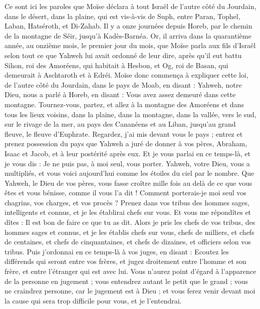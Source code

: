 \begin{multicols}{2}
\VerseOne{}Ce sont ici les paroles que Moïse déclara à tout Israël de l'autre côté du Jourdain, dans le désert, dans la plaine, qui est vis-à-vis de Suph, entre Paran, Tophel, Laban, Hatséroth, et Di-Zahab.
Il y a onze journées depuis Horeb, par le chemin de la montagne de Séir, jusqu'à Kadès-Barnéa.
Or, il arriva dans la quarantième année, au onzième mois, le premier jour du mois, que Moïse parla aux fils d'Israël selon tout ce que Yahweh lui avait ordonné de leur dire,
après qu'il eut battu Sihon, roi des Amoréens, qui habitait à Hesbon, et Og, roi de Basan, qui demeurait à Aschtaroth et à Edréi.
Moïse donc commença à expliquer cette loi, de l'autre côté du Jourdain, dans le pays de Moab, en disant :
Yahweh, notre Dieu, nous a parlé à Horeb, en disant : Vous avez assez demeuré dans cette montagne.
Tournez-vous, partez, et allez à la montagne des Amoréens et dans tous les lieux voisins, dans la plaine, dans la montagne, dans la vallée, vers le sud, sur le rivage de la mer, au pays des Cananéens et au Liban, jusqu'au grand fleuve, le fleuve d'Euphrate.
Regardez, j'ai mis devant vous le pays ; entrez et prenez possession du pays que Yahweh a juré de donner à vos pères, Abraham, Isaac et Jacob, et à leur postérité après eux.
Et je vous parlai en ce temps-là, et je vous dis : Je ne puis pas, à moi seul, vous porter.
Yahweh, votre Dieu, vous a multipliés, et vous voici aujourd'hui comme les étoiles du ciel par le nombre.
Que Yahweh, le Dieu de vos pères, vous fasse croître mille fois au delà de ce que vous êtes et vous bénisse, comme il vous l'a dit !
Comment porterais-je moi seul vos chagrins, vos charges, et vos procès ?
Prenez dans vos tribus des hommes sages, intelligents et connus, et je les établirai chefs sur vous. 
Et vous me répondîtes et dîtes : Il est bon de faire ce que tu as dit.
Alors je pris les chefs de vos tribus, des hommes sages et connus, et je les établis chefs sur vous, chefs de milliers, et chefs de centaines, et chefs de cinquantaines, et chefs de dizaines, et officiers selon vos tribus. 
Puis j'ordonnai en ce temps-là à vos juges, en disant : Ecoutez les différends qui seront entre vos frères, et jugez droitement entre l'homme et son frère, et entre l'étranger qui est avec lui.
Vous n'aurez point d'égard à l'apparence de la personne en jugement ; vous entendrez autant le petit que le grand ; vous ne craindrez personne, car le jugement est à Dieu ; et vous ferez venir devant moi la cause qui sera trop difficile pour vous, et je l'entendrai. 

\end{multicols}
